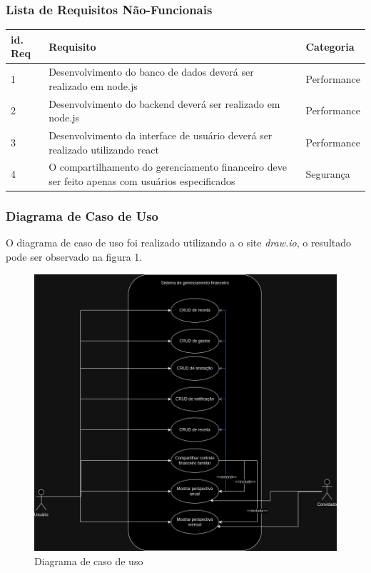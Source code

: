 \subsubsection{Lista de Requisitos Não-Funcionais}

\begin{longtable}[h!]{ | M{1.5cm} | T{9cm} | l | } \hline

    \textbf{id. Req} & \textbf{Requisito} &\textbf{Categoria} \\ [5pt] \hline
    
    1 & Desenvolvimento do banco de dados deverá ser realizado em node.js & Performance \\  \hline

    2 & Desenvolvimento do backend deverá ser realizado em node.js & Performance \\  \hline

    3 & Desenvolvimento da interface de usuário deverá ser realizado  utilizando react & Performance \\  \hline

    4 & O compartilhamento do gerenciamento financeiro deve ser feito apenas com usuários especificados & Segurança \\  \hline

\end{longtable}

\subsubsection{Diagrama de Caso de Uso}
O diagrama de caso de uso foi realizado utilizando a o site \textit{draw.io}, o resultado pode ser observado na figura 1. 
\begin{figure}[h!]
    \centering
    \caption{Diagrama de caso de uso}
    \includegraphics[scale=0.4]{images/money-tracker-Use-Case-Diagram.png}
\end{figure}

